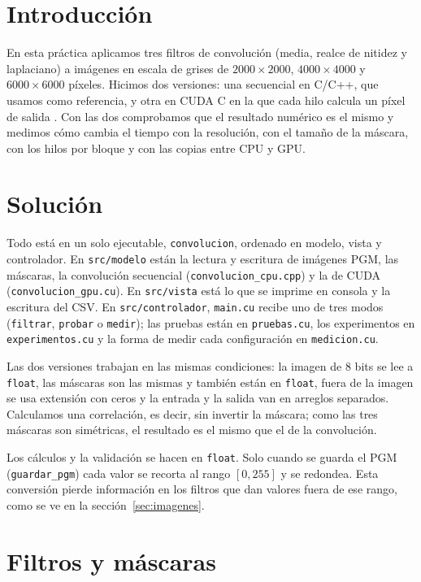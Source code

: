 \documentclass[12pt]{article}
\begin{document}
\section{Introducción}

En esta práctica aplicamos tres filtros de convolución (media, realce de nitidez y laplaciano)
a imágenes en escala de grises de $2000\times2000$, $4000\times4000$ y $6000\times6000$ píxeles.
Hicimos dos versiones: una secuencial en C/C++, que usamos como referencia, y otra en CUDA C en
la que cada hilo calcula un píxel de salida \cite{cudaguide,sanders2010}. Con las dos
comprobamos que el resultado numérico es el mismo y medimos cómo cambia el tiempo con la
resolución, con el tamaño de la máscara, con los hilos por bloque y con las copias entre CPU y
GPU.

\section{Solución}

Todo está en un solo ejecutable, \texttt{convolucion}, ordenado en modelo, vista y controlador.
En \texttt{src/modelo} están la lectura y escritura de imágenes PGM, las máscaras, la
convolución secuencial (\texttt{convolucion\_cpu.cpp}) y la de CUDA
(\texttt{convolucion\_gpu.cu}). En \texttt{src/vista} está lo que se imprime en consola y la
escritura del CSV. En \texttt{src/controlador}, \texttt{main.cu} recibe uno de tres modos
(\texttt{filtrar}, \texttt{probar} o \texttt{medir}); las pruebas están en
\texttt{pruebas.cu}, los experimentos en \texttt{experimentos.cu} y la forma de medir cada
configuración en \texttt{medicion.cu}.

Las dos versiones trabajan en las mismas condiciones: la imagen de 8 bits se lee a
\texttt{float}, las máscaras son las mismas y también están en \texttt{float}, fuera de la
imagen se usa extensión con ceros y la entrada y la salida van en arreglos separados.
Calculamos una correlación, es decir, sin invertir la máscara; como las tres máscaras son
simétricas, el resultado es el mismo que el de la convolución.

Los cálculos y la validación se hacen en \texttt{float}. Solo cuando se guarda el PGM
(\texttt{guardar\_pgm}) cada valor se recorta al rango $[0,255]$ y se redondea. Esta
conversión pierde información en los filtros que dan valores fuera de ese rango, como se ve
en la sección~\ref{sec:imagenes}.

\section{Filtros y máscaras}
\end{document}
